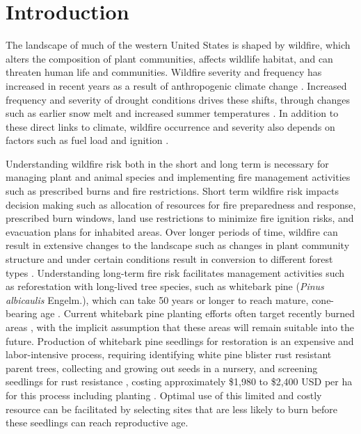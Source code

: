 \documentclass[11p]{article}
\begin{document}
\section{Introduction}

The landscape of much of the western United States is shaped by wildfire, which alters the composition of plant communities, affects wildlife habitat, and can threaten human life and communities. Wildfire severity and frequency has increased in recent years as a result of anthropogenic climate change \citep{abatzoglouImpactAnthropogenicClimate2016,runningGlobalWarmingCausing2006,boerChangingWeatherExtremes2017,littellReviewRelationshipsDrought2016}. Increased frequency and severity of drought conditions drives these shifts, through changes such as earlier snow melt \citep{tercekForecasts21stCentury2016} and increased summer temperatures \citep{runningGlobalWarmingCausing2006}. In addition to these direct links to climate, wildfire occurrence and severity also depends on factors such as fuel load and ignition \citep{mckenzieClimateChangeEcohydrology2017}.

Understanding wildfire risk both in the short and long term is necessary for managing plant and animal species and implementing fire management activities such as prescribed burns and fire restrictions. Short term wildfire risk impacts decision making such as allocation of resources for fire preparedness and response, prescribed burn windows, land use restrictions to minimize fire ignition risks, and evacuation plans for inhabited areas. Over longer periods of time, wildfire can result in extensive changes to the landscape such as changes in plant community structure and under certain conditions result in conversion to different forest types \citep{coopWildfireDrivenForestConversion2020}. Understanding long-term fire risk facilitates management activities such as reforestation with long-lived tree species, such as whitebark pine (\textit{Pinus albicaulis} Engelm.), which can take 50 years or longer to reach mature, cone-bearing age \citep{tombackWhitebarkPineCommunities2001}. Current whitebark pine planting efforts often target recently burned areas \citep{keaneRangewideRestorationStrategy2012}, with the implicit assumption that these areas will remain suitable into the future. Production of whitebark pine seedlings for restoration is an expensive and labor-intensive process, requiring identifying white pine blister rust resistant parent trees, collecting and growing out seeds in a nursery, and screening seedlings for rust resistance \citep{tombackTammReviewCurrent2022}, costing approximately \$1,980 to \$2,400 USD per ha for this process including planting \citep{tombackMagnificentHighElevationFiveNeedle2011}. Optimal use of this limited and costly resource can be facilitated by selecting sites that are less likely to burn before these seedlings can reach reproductive age.
\end{document}
